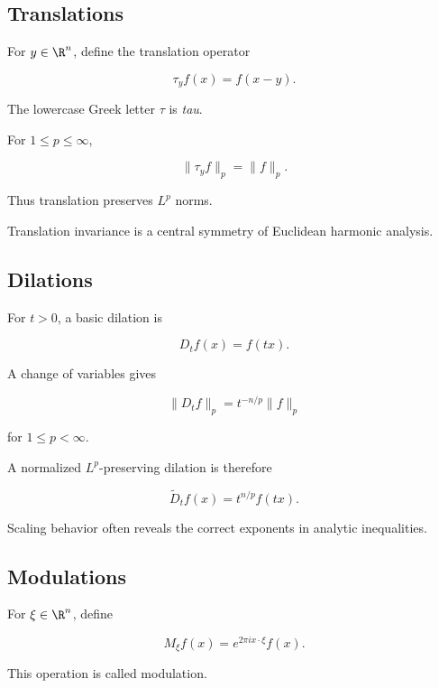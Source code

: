 \subsection{Translations}
\label{subsec:harmonic-translations}

For \(y\in\R^n\), define the translation operator

\[
\boxed{
\tau_yf(x)=f(x-y).
}
\]

The lowercase Greek letter \(\tau\) is \emph{tau}.

For \(1\leq p\leq\infty\),

\[
\boxed{
\|\tau_yf\|_p
=
\|f\|_p.
}
\]

Thus translation preserves \(L^p\) norms.

Translation invariance is a central symmetry of Euclidean harmonic
analysis.

\subsection{Dilations}
\label{subsec:harmonic-dilations}

For \(t>0\), a basic dilation is

\[
\boxed{
D_tf(x)=f(tx).
}
\]

A change of variables gives

\[
\boxed{
\|D_tf\|_p
=
t^{-n/p}\|f\|_p
}
\]

for \(1\leq p<\infty\).

A normalized \(L^p\)-preserving dilation is therefore

\[
\boxed{
\widetilde{D}_tf(x)
=
t^{n/p}f(tx).
}
\]

Scaling behavior often reveals the correct exponents in analytic
inequalities.

\subsection{Modulations}
\label{subsec:harmonic-modulations}

For \(\xi\in\R^n\), define

\[
\boxed{
M_\xi f(x)
=
e^{2\pi i x\cdot\xi}f(x).
}
\]

This operation is called modulation.

